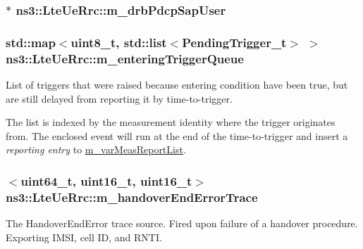 \subsubsection[{\texorpdfstring{m\+\_\+drb\+Pdcp\+Sap\+User}{m_drbPdcpSapUser}}]{$\ast$ ns3\+::\+Lte\+Ue\+Rrc\+::m\+\_\+drb\+Pdcp\+Sap\+User\hspace{0.3cm}{\ttfamily [private]}}\hypertarget{classns3_1_1LteUeRrc_a6f2505a766e5a391d82170ebff83a9c2}{}\label{classns3_1_1LteUeRrc_a6f2505a766e5a391d82170ebff83a9c2}
\subsubsection[{\texorpdfstring{m\+\_\+entering\+Trigger\+Queue}{m_enteringTriggerQueue}}]{\setlength{\rightskip}{0pt plus 5cm}std\+::map$<$uint8\+\_\+t, {\bf std\+::list}$<${\bf Pending\+Trigger\+\_\+t}$>$ $>$ ns3\+::\+Lte\+Ue\+Rrc\+::m\+\_\+entering\+Trigger\+Queue\hspace{0.3cm}{\ttfamily [private]}}\hypertarget{classns3_1_1LteUeRrc_a06a26d8b08a9c635d7fa6ff8381fff4f}{}\label{classns3_1_1LteUeRrc_a06a26d8b08a9c635d7fa6ff8381fff4f}


List of triggers that were raised because entering condition have been true, but are still delayed from reporting it by time-\/to-\/trigger. 

The list is indexed by the measurement identity where the trigger originates from. The enclosed event will run at the end of the time-\/to-\/trigger and insert a {\itshape reporting entry} to \hyperlink{classns3_1_1LteUeRrc_a82da3c138c967761910c02b83724a0e4}{m\+\_\+var\+Meas\+Report\+List}. 
\subsubsection[{\texorpdfstring{m\+\_\+handover\+End\+Error\+Trace}{m_handoverEndErrorTrace}}]{$<$uint64\+\_\+t, uint16\+\_\+t, uint16\+\_\+t$>$ ns3\+::\+Lte\+Ue\+Rrc\+::m\+\_\+handover\+End\+Error\+Trace\hspace{0.3cm}{\ttfamily [private]}}\hypertarget{classns3_1_1LteUeRrc_a226e5db3b276ff4cb1c1ca4b6a166190}{}\label{classns3_1_1LteUeRrc_a226e5db3b276ff4cb1c1ca4b6a166190}
The {\ttfamily Handover\+End\+Error} trace source. Fired upon failure of a handover procedure. Exporting I\+M\+SI, cell ID, and R\+N\+TI. 
